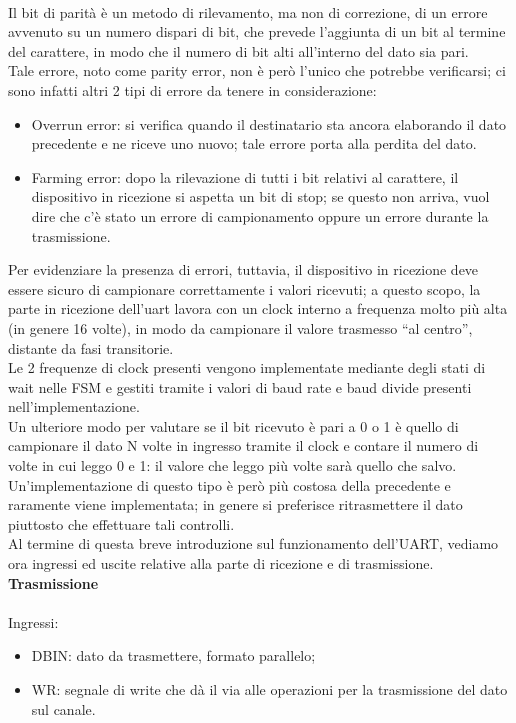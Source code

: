 \documentclass[12pt]{article}
\begin{document}
\\Il bit di parità è un metodo di rilevamento, ma non di correzione, di un errore avvenuto su un numero dispari di bit, che prevede l’aggiunta di un bit al termine del carattere, in modo che il numero di bit alti all’interno del dato sia pari.
\\Tale errore, noto come parity error, non è però l’unico che potrebbe verificarsi; ci sono infatti altri 2 tipi di errore da tenere in considerazione:
\begin{itemize}
    \item Overrun error: si verifica quando il destinatario sta ancora elaborando il dato precedente e ne riceve uno nuovo; tale errore porta alla perdita del dato.
    \item Farming error: dopo la rilevazione di tutti i bit relativi al carattere, il dispositivo in ricezione si aspetta un bit di stop; se questo non arriva, vuol dire che c’è stato un errore di campionamento oppure un errore durante la trasmissione.
\end{itemize}
Per evidenziare la presenza di errori, tuttavia, il dispositivo in ricezione deve essere sicuro di campionare correttamente i valori ricevuti; a questo scopo, la parte in ricezione dell’uart lavora con un clock interno a frequenza molto più alta (in genere 16 volte), in modo da campionare il valore trasmesso “al centro”, distante da fasi transitorie.
\\Le 2 frequenze di clock presenti vengono implementate mediante degli stati di wait nelle FSM e gestiti tramite i valori di baud rate e baud divide presenti nell’implementazione.
\\Un ulteriore modo per valutare se il bit ricevuto è pari a 0 o 1 è quello di campionare il dato N volte in ingresso tramite il clock e contare il numero di volte in cui leggo 0 e 1: il valore che leggo più volte sarà quello che salvo.
\\Un’implementazione di questo tipo è però più costosa della precedente e raramente viene implementata; in genere si preferisce ritrasmettere il dato piuttosto che effettuare tali controlli.
\\Al termine di questa breve introduzione sul funzionamento dell’UART, vediamo ora ingressi ed uscite relative alla parte di ricezione e di trasmissione.
\clearpage
{\large \textbf{Trasmissione}}
\\\\Ingressi:
\begin{itemize}
    \item DBIN: dato da trasmettere, formato parallelo;
    \item WR: segnale di write che dà il via alle operazioni per la trasmissione del dato sul canale.
\end{itemize}
\end{document}
